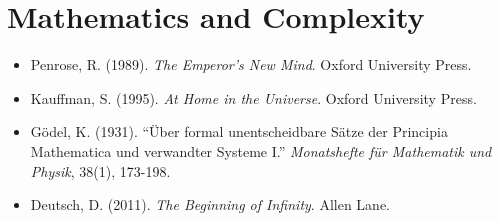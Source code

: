 \documentclass[12pt]{article}
\providecommand{\tightlist}{\setlength{\itemsep}{0pt}\setlength{\parskip}{0pt}}
\begin{document}
\section{Mathematics and
Complexity}\label{mathematics-and-complexity}

\begin{itemize}
\tightlist
\item
  Penrose, R. (1989). \emph{The Emperor's New Mind}. Oxford University
  Press.
\item
  Kauffman, S. (1995). \emph{At Home in the Universe}. Oxford University
  Press.
\item
  Gödel, K. (1931). ``Über formal unentscheidbare Sätze der Principia
  Mathematica und verwandter Systeme I.'' \emph{Monatshefte für
  Mathematik und Physik}, 38(1), 173-198.
\item
  Deutsch, D. (2011). \emph{The Beginning of Infinity}. Allen Lane.
\end{itemize}
\end{document}
